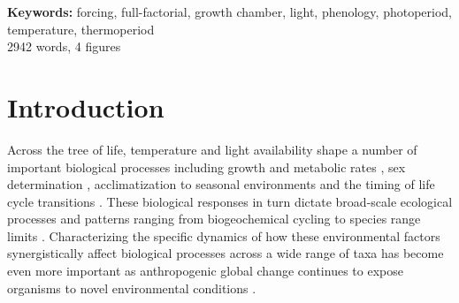 \documentclass[11pt]{article}
\begin{document}
\textbf{Keywords:}  forcing, full-factorial,  growth chamber, light,  phenology, photoperiod, temperature, thermoperiod \\

2942 words, 4 figures
\pagebreak
\section*{Introduction}
\noindent Across the tree of life, temperature and light availability shape a number of important biological processes including growth and metabolic rates \citep{MacLean:2019aa}, sex determination \citep{Brown:2014vn}, acclimatization to seasonal environments \citep{Hamilton2016} and the timing of life cycle transitions \citep[i.e., phenology,][]{Forrest2010}. These biological responses in turn dictate broad-scale ecological processes and patterns ranging from biogeochemical cycling \citep{Piao2007} to species range limits \citep{Chuine2001}. Characterizing the specific dynamics of how these environmental factors synergistically affect biological processes across a wide range of taxa has become even more important as anthropogenic global change continues to expose organisms to novel environmental conditions \citep{Portner:2008vd}.
\end{document}
